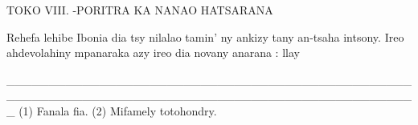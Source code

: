 TOKO VIII. -PORITRA KA NANAO HATSARANA

Rehefa lehibe Ibonia dia tsy nilalao tamin' ny ankizy tany an-tsaha
intsony. Ireo ahdevolahiny mpanaraka azy ireo dia novany anarana : llay

_________________________________________________________________________________________________
(1) Fanala fia. 
(2) Mifamely totohondry.